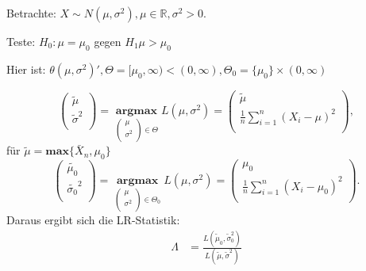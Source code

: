 \documentclass[10pt]{article}
\newcommand{\IR}{\mathbb{R}} %
\newcommand{\sni}{\sum_{i=1}^{n}} %
\newenvironment{BSP}[1][]
{\begin{Beispiel}[frametitle=#1]}{\end{Beispiel}}
\begin{document}
	\begin{BSP}[Beispiel 2.1.4 (t-Test mit einseitiger Alternative)]
	Betrachte: $X \sim N(\mu, \sigma^2), \mu \in \IR, \sigma^2 >0$.
	
	Teste: $H_0: \mu = \mu_0$ gegen $H_1 \mu > \mu_0$
	
	Hier ist: $\theta(\mu, \sigma^2)', \Theta = [\mu_0, \infty) < (0,\infty), \Theta_0 = \{\mu_0\} \times (0, \infty)$
	
		\begin{equation*}
		\left(\begin{array}{c}
			\tilde{\mu}\\
			\tilde{\sigma}^2\\
		\end{array}\right) = \; \underset{	\left(\begin{array}{c}
				\mu\\
				\sigma^2\\
			\end{array}\right) \in \Theta}{\textbf{argmax}} \; L(\mu, \sigma^2) = \left(\begin{array}{c}
			\tilde{\mu}\\
			\frac{1}{n} \sni (X_i - \mu)^2\\
		\end{array}\right),
	\end{equation*}
	für $\tilde{\mu} = \textbf{max}\{\bar{X}_n, \mu_0\}$
	\begin{equation*}
		\left(\begin{array}{c}
			\tilde{\mu_0}\\
			\tilde{\sigma_0}^2\\
		\end{array}\right) = \; \underset{	\left(\begin{array}{c}
				\mu\\
				\sigma^2\\
			\end{array}\right) \in \Theta_0}{\textbf{argmax}} \; L(\mu, \sigma^2) = \left(\begin{array}{c}
			\mu_0\\
			\frac{1}{n} \sni (X_i - \mu_0)^2\\
		\end{array}\right).
	\end{equation*}
	Daraus ergibt sich die LR-Statistik:
	\begin{equation*}
		\begin{split}
			\Lambda &= \frac{L(\tilde{\mu}_0, \tilde{\sigma}^2_0)}{L(\tilde{\mu}, \tilde{\sigma}^2)}\\

\end{split}
\end{equation*}
\end{BSP}
\end{document}
